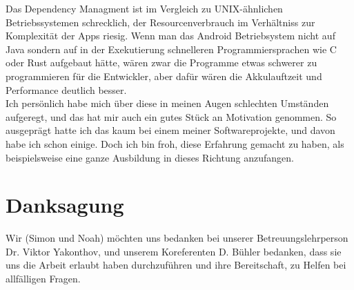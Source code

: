 \documentclass[a4paper,11pt]{article}
\begin{document}
Das Dependency Managment ist im Vergleich zu UNIX-ähnlichen Betriebssystemen schrecklich, der Resourcenverbrauch im Verhältniss zur Komplexität der Apps riesig. Wenn man das Android Betriebsystem nicht auf Java sondern auf in der Exekutierung schnelleren Programmiersprachen wie C oder Rust aufgebaut hätte, wären zwar die Programme etwas schwerer zu programmieren für die Entwickler, aber dafür wären die Akkulauftzeit und Performance deutlich besser.\\

Ich persönlich habe mich über diese in meinen Augen schlechten Umständen aufgeregt, und das hat mir auch ein gutes Stück an Motivation genommen. So ausgeprägt hatte ich das kaum bei einem meiner Softwareprojekte, und davon habe ich schon einige. Doch ich bin froh, diese Erfahrung gemacht zu haben, als beispielsweise eine ganze Ausbildung in dieses Richtung anzufangen.

\section{Danksagung}
Wir (Simon und Noah) möchten uns bedanken bei unserer Betreuungslehrperson Dr. Viktor Yakonthov, und unserem Koreferenten D. Bühler bedanken, dass sie uns die Arbeit erlaubt haben durchzuführen und ihre Bereitschaft, zu Helfen bei allfälligen Fragen.



















\printbibliography
\end{document}
